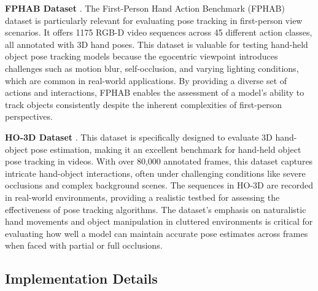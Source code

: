 \noindent \textbf{FPHAB Dataset} \cite{garcia2018first}. The First-Person Hand Action Benchmark (FPHAB) dataset is particularly relevant for evaluating pose tracking in first-person view scenarios. It offers 1175 RGB-D video sequences across 45 different action classes, all annotated with 3D hand poses. This dataset is valuable for testing hand-held object pose tracking models because the egocentric viewpoint introduces challenges such as motion blur, self-occlusion, and varying lighting conditions, which are common in real-world applications. By providing a diverse set of actions and interactions, FPHAB enables the assessment of a model's ability to track objects consistently despite the inherent complexities of first-person perspectives. \DIFaddbegin {}\DIFaddend 

\noindent \textbf{HO-3D Dataset} \cite{hampali2020honnotate}. This dataset is specifically designed to evaluate 3D hand-object pose estimation, making it an excellent benchmark for hand-held object pose tracking in videos. With over 80,000 annotated frames, this dataset captures intricate hand-object interactions, often under challenging conditions like severe occlusions and complex background scenes. The sequences in HO-3D are recorded in real-world environments, providing a realistic testbed for assessing the effectiveness of pose tracking algorithms. The dataset's emphasis on naturalistic hand movements and object manipulation in cluttered environments is critical for evaluating how well a model can maintain accurate pose estimates across frames when faced with partial or full occlusions. \DIFaddbegin {}\DIFaddend 

\subsection{Implementation Details}

